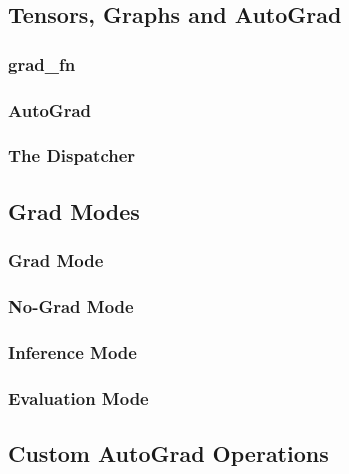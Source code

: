     \subsection*{Tensors, Graphs and AutoGrad}\label{subsubsec:autograd}
        
        \subsubsection*{grad\_fn}\label{subsubsec:grad_fn}
          
        \subsubsection*{AutoGrad\hfill\normalsize{}}\label{subsubsec:name}
          
        \subsubsection*{The Dispatcher}\label{subsubsec:dispatch}


      \subsection*{Grad Modes}\label{subsubsubsec:grad_modes}
      \subsubsection{Grad Mode}
      \subsubsection{No-Grad Mode\hfill\normalsize{}}
        
      \subsubsection{Inference Mode}
      \subsubsection{Evaluation Mode}
      \subsection*{Custom AutoGrad Operations}
